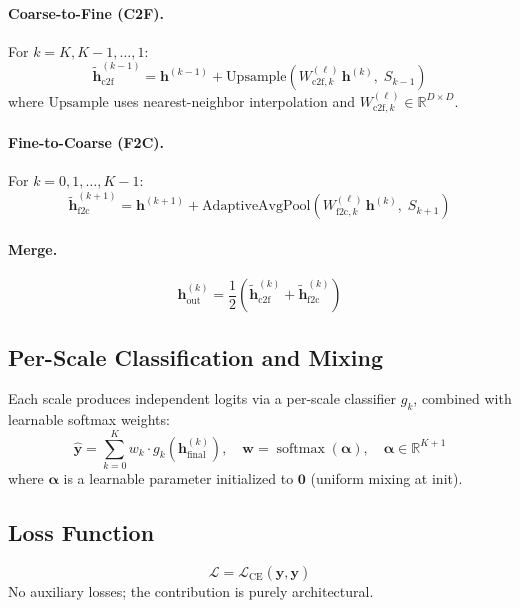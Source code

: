 \documentclass{article}
\DeclareMathOperator{\softmax}{softmax}
\newcommand{\R}{\mathbb{R}}
\newcommand{\mL}{\mathcal{L}}
\begin{document}
\paragraph{Coarse-to-Fine (C2F).}
For $k = K, K{-}1, \ldots, 1$:
\begin{equation}
\tilde{\bm{h}}^{(k-1)}_\text{c2f} = \bm{h}^{(k-1)} + \text{Upsample}\!\left(W^{(\ell)}_{\text{c2f},k}\, \bm{h}^{(k)},\; S_{k-1}\right)
\end{equation}
where $\text{Upsample}$ uses nearest-neighbor interpolation and $W^{(\ell)}_{\text{c2f},k} \in \R^{D \times D}$.

\paragraph{Fine-to-Coarse (F2C).}
For $k = 0, 1, \ldots, K{-}1$:
\begin{equation}
\tilde{\bm{h}}^{(k+1)}_\text{f2c} = \bm{h}^{(k+1)} + \text{AdaptiveAvgPool}\!\left(W^{(\ell)}_{\text{f2c},k}\, \bm{h}^{(k)},\; S_{k+1}\right)
\end{equation}

\paragraph{Merge.}
\begin{equation}
\bm{h}^{(k)}_\text{out} = \frac{1}{2}\!\left(\tilde{\bm{h}}^{(k)}_\text{c2f} + \tilde{\bm{h}}^{(k)}_\text{f2c}\right)
\end{equation}

\subsection{Per-Scale Classification and Mixing}

Each scale produces independent logits via a per-scale classifier $g_k$, combined with learnable softmax weights:
\begin{equation}
\hat{\bm{y}} = \sum_{k=0}^{K} w_k \cdot g_k(\bm{h}^{(k)}_\text{final}), \quad
\bm{w} = \softmax(\bm{\alpha}), \quad \bm{\alpha} \in \R^{K+1}
\end{equation}
where $\bm{\alpha}$ is a learnable parameter initialized to $\bm{0}$ (uniform mixing at init).

\subsection{Loss Function}

\begin{equation}
\mL = \mL_\text{CE}(\hat{\bm{y}}, \bm{y})
\end{equation}
No auxiliary losses; the contribution is purely architectural.
\end{document}
